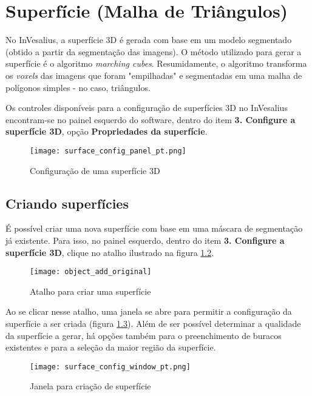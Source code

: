 \chapter{Superfície (Malha de Triângulos)}
\label{cap_surface}

No InVesalius, a superfície 3D é gerada com base em um modelo segmentado (obtido a partir
da segmentação das imagens). O método utilizado para gerar a superfície é o algoritmo 
\textit{marching cubes}. Resumidamente, o algoritmo transforma os \textit{voxels} das
imagens que foram "empilhadas" e segmentadas em uma malha de polígonos simples - no caso,
triângulos.

Os controles disponíveis para a configuração de superfícies 3D no InVesalius encontram-se
no painel esquerdo do software, dentro do item \textbf{3. Configure a superfície 3D}, opção
\textbf{Propriedades da superfície}.

\begin{figure}[!htb]
\centering
\texttt{[image: surface\_config\_panel\_pt.png]}
\caption{Configuração de uma superfície 3D}
\label{fig:3d_surface_managment}
\end{figure}


\section{Criando superfícies}

É possível criar uma nova superfície com base em uma máscara de segmentação já existente.
Para isso, no painel esquerdo, dentro do item \textbf{3. Configure a superfície 3D}, clique
no atalho ilustrado na figura \ref{fig:shortcut_new_surface}.

\begin{figure}[!htb]
\centering
\texttt{[image: object\_add\_original]}
\caption{Atalho para criar uma superfície}
\label{fig:shortcut_new_surface}
\end{figure}

Ao se clicar nesse atalho, uma janela se abre para permitir a configuração da superfície a
ser criada (figura \ref{fig:create_surface_1}). Além de ser possível determinar a qualidade
da superfície a gerar, há opções também para o preenchimento de buracos existentes e para a
seleção da maior região da superfície.

\begin{figure}[!htb]
\centering
\texttt{[image: surface\_config\_window\_pt.png]}
\caption{Janela para criação de superfície}
\label{fig:create_surface_1}
\end{figure}


